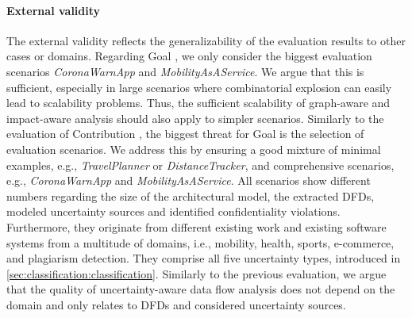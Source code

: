 \paragraph*{External validity}
The external validity reflects the generalizability of the evaluation results to other cases or domains.
Regarding Goal , we only consider the biggest evaluation scenarios \emph{CoronaWarnApp} and \emph{MobilityAsAService}.
We argue that this is sufficient, especially in large scenarios where combinatorial explosion can easily lead to scalability problems.
Thus, the sufficient scalability of graph-aware and impact-aware analysis should also apply to simpler scenarios.
Similarly to the evaluation of Contribution , the biggest threat for Goal  is the selection of evaluation scenarios.
We address this by ensuring a good mixture of minimal examples, e.g., \emph{TravelPlanner} or \emph{DistanceTracker}, and comprehensive scenarios, e.g., \emph{CoronaWarnApp} and \emph{MobilityAsAService}.
All scenarios show different numbers regarding the size of the architectural model, the extracted \acp{DFD}, modeled uncertainty sources and identified confidentiality violations.
Furthermore, they originate from different existing work and existing software systems from a multitude of domains, i.e., mobility, health, sports, e-commerce, and plagiarism detection.
They comprise all five uncertainty types, introduced in \autoref{sec:classification:classification}.
Similarly to the previous evaluation, we argue that the quality of uncertainty-aware data flow analysis does not depend on the domain and only relates to \acp{DFD} and considered uncertainty sources.


